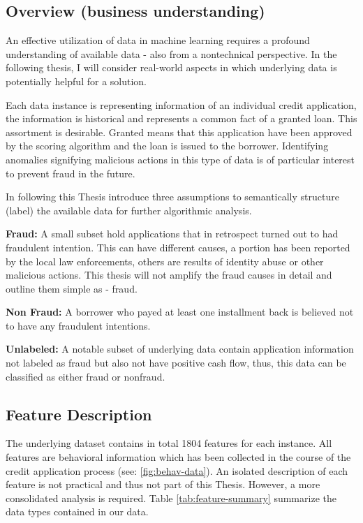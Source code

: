 \subsection{Overview (business understanding)}\label{Ch:2:Overview}

An effective utilization of data in machine learning requires a profound understanding of available data - also from a nontechnical perspective. In the following thesis, I will consider real-world aspects in which underlying data is potentially helpful for a solution.

Each data instance is representing information of an individual credit application, the information is historical and represents a common fact of a granted loan. This assortment is desirable. Granted means that this application have been approved by the scoring algorithm and the loan is issued to the borrower. Identifying anomalies signifying malicious actions in this type of data is of particular interest to prevent fraud in the future.

In following this Thesis introduce three assumptions to semantically structure (label) the available data for further algorithmic analysis.

\textbf{Fraud:} 
A small subset hold applications that in retrospect turned out to had fraudulent intention. This can have different causes, a portion has been reported by the local law enforcements, others are results of identity abuse or other malicious actions. This thesis will not amplify the fraud causes in detail and outline them simple as -  fraud.

\textbf{Non Fraud:} 
A borrower who payed at least one installment back is believed not to have any fraudulent intentions. 


\textbf{Unlabeled:}
A notable subset of underlying data contain application information not labeled as fraud but also not have positive cash flow, thus, this data can be classified as either fraud or nonfraud. 

\subsection{Feature Description}\label{Ch:2:FeatureDesc}

The underlying dataset contains in total 1804 features for each instance. All features are behavioral information which has been collected in the course of the credit application process (see: \ref{fig:behav-data}). An isolated description of each feature is not practical and thus not part of this Thesis. However, a more consolidated analysis is required. Table \ref{tab:feature-summary} summarize the data types contained in our data.


